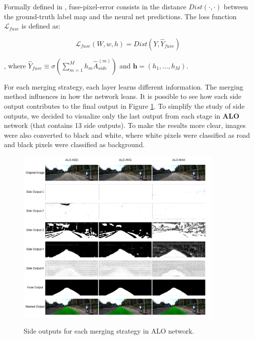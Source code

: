 Formally defined in \cite{xie2015}, fuse-pixel-error consists in the distance $Dist(\cdot , \cdot)$ between the ground-truth label map and the neural net predictions. The loss function $\mathcal{L}_{fuse}$ is defined as:

\begin{equation}
 \mathcal{L}_{fuse}(W, w, h) = Dist(Y, \hat{Y}_{fuse} )
 \label{eq:fuse_pixel_error}
\end{equation}

, where $\hat{Y}_{fuse} \equiv \sigma(\sum_{m=1}^{M}{h_m \hat{A}^{(m)}_{side}})$ and $\mathbf{h} = (h_1, ..., h_M)$.

\vspace{0.3cm}

For each merging strategy, each layer learns different information. The merging method influences in how the network leans. It is possible to see how each side output contributes to the final output in Figure \ref{fig:side_outputs}. To simplify the study of side outputs, we decided to visualize only the last  output from each stage in \textbf{ALO} network (that contains 13 side outputs). To make the results more clear, images were also converted to black and white, where white pixels were classified as road and black pixels were classified as background.

\begin{figure}
  \caption{Side outputs for each merging strategy in ALO network.}
  \centering
  \includegraphics[width=0.9\textwidth]{figures/falreis/side_outputs.png}
  \label{fig:side_outputs}
\end{figure}

